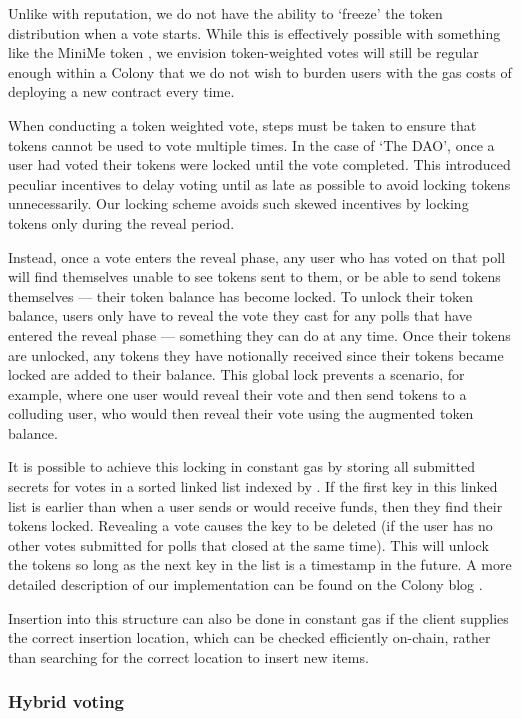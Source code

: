 Unlike with reputation, we do not have the ability to `freeze' the token distribution when a vote starts. While this is effectively possible with something like the MiniMe token \cite{minime}, we envision token-weighted votes will still be regular enough within a Colony that we do not wish to burden users with the gas costs of deploying a new contract every time.

When conducting a token weighted vote, steps must be taken to ensure that tokens cannot be used to vote multiple times. In the case of `The DAO', once a user had voted their tokens were locked until the vote completed. This introduced peculiar incentives to delay voting until as late as possible to avoid locking tokens unnecessarily.  Our locking scheme avoids such skewed incentives by locking tokens only during the reveal period.

Instead, once a vote enters the reveal phase, any user who has voted on that poll will find themselves unable to see tokens sent to them, or be able to send tokens themselves --- their token balance has become locked. To unlock their token balance, users only have to reveal the vote they cast for any polls that have entered the reveal phase --- something they can do at any time. Once their tokens are unlocked, any tokens they have notionally received since their tokens became locked are added to their balance. This global lock prevents a scenario, for example, where one user would reveal their vote and then send tokens to a colluding user, who would then reveal their vote using the augmented token balance.

It is possible to achieve this locking in constant gas by storing all submitted secrets for votes in a sorted linked list indexed by . If the first key in this linked list is earlier than  when a user sends or would receive funds, then they find their tokens locked. Revealing a vote causes the key to be deleted (if the user has no other votes submitted for polls that closed at the same time). This will unlock the tokens so long as the next key in the list is a timestamp in the future. A more detailed description of our implementation can be found on the Colony blog \cite{ColonyVoting}.

Insertion into this structure can also be done in constant gas if the client supplies the correct insertion location, which can be checked efficiently on-chain, rather than searching for the correct location to insert new items.

\subsubsection*{Hybrid voting}

